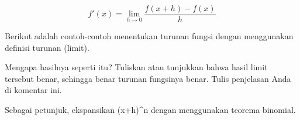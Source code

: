 \documentclass[a4paper,10pt]{article}
\begin{document}
\begin{eulernotebook}
\begin{eulercomment}
\end{eulercomment}
\begin{eulerformula}
\[
f'(x) = \lim_{h\to 0} \frac{f(x+h)-f(x)}{h}
\]
\end{eulerformula}
\begin{eulercomment}
Berikut adalah contoh-contoh menentukan turunan fungsi dengan
menggunakan definisi turunan (limit).
\end{eulercomment}
\begin{eulercomment}
Mengapa hasilnya seperti itu? Tuliskan atau tunjukkan bahwa hasil
limit tersebut benar, sehingga benar turunan fungsinya benar.  Tulis
penjelasan Anda di komentar ini.

Sebagai petunjuk, ekspansikan (x+h)\textasciicircum{}n dengan menggunakan teorema
binomial.


\end{eulercomment}
\end{eulernotebook}
\end{document}
